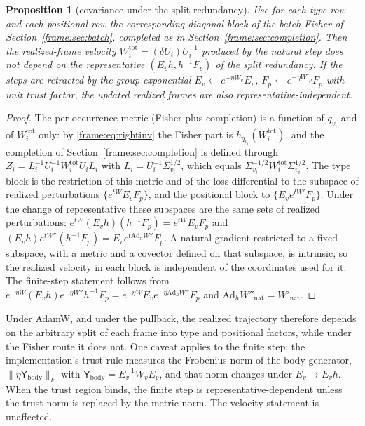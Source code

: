 \documentclass[11pt]{article}
\newtheorem{proposition}[theorem]{Proposition}
\theoremstyle{definition}
\theoremstyle{remark}
\providecommand{\Ad}{\mathrm{Ad}}
\begin{document}
\begin{proposition}[covariance under the split redundancy]\label{frame:prop:split}
Use for each type row and each positional row the corresponding diagonal block of the batch Fisher of Section~\ref{frame:sec:batch}, completed as in Section~\ref{frame:sec:completion}. Then the realized-frame velocity $W_i^{\mathrm{tot}}=(\delta U_i)U_i^{-1}$ produced by the natural step does not depend on the representative $(E_vh,h^{-1}F_p)$ of the split redundancy. If the steps are retracted by the group exponential $E_v\leftarrow e^{-\eta W_v}E_v$, $F_p\leftarrow e^{-\eta W'_p}F_p$ with unit trust factor, the updated realized frames are also representative-independent.
\end{proposition}
\begin{proof}
The per-occurrence metric (Fisher plus completion) is a function of $q_{v_i}$ and of $W_i^{\mathrm{tot}}$ only: by \eqref{frame:eq:rightinv} the Fisher part is $h_{q_{v_i}}(W_i^{\mathrm{tot}})$, and the completion of Section~\ref{frame:sec:completion} is defined through $Z_i=L_i^{-1}U_i^{-1}W_i^{\mathrm{tot}}U_iL_i$ with $L_i=U_i^{-1}\Sigma_{v_i}^{1/2}$, which equals $\Sigma_{v_i}^{-1/2}W_i^{\mathrm{tot}}\Sigma_{v_i}^{1/2}$. The type block is the restriction of this metric and of the loss differential to the subspace of realized perturbations $\{e^{tW}E_vF_p\}$, and the positional block to $\{E_ve^{tW'}F_p\}$. Under the change of representative these subspaces are the same sets of realized perturbations: $e^{tW}(E_vh)(h^{-1}F_p)=e^{tW}E_vF_p$ and $(E_vh)e^{tW''}(h^{-1}F_p)=E_ve^{t\Ad_hW''}F_p$. A natural gradient restricted to a fixed subspace, with a metric and a covector defined on that subspace, is intrinsic, so the realized velocity in each block is independent of the coordinates used for it. The finite-step statement follows from $e^{-\eta W}(E_vh)e^{-\eta W''}h^{-1}F_p=e^{-\eta W}E_ve^{-\eta\Ad_hW''}F_p$ and $\Ad_hW''_{\mathrm{nat}}=W'_{\mathrm{nat}}$.
\end{proof}

Under AdamW, and under the pullback, the realized trajectory therefore depends on the arbitrary split of each frame into type and positional factors, while under the Fisher route it does not. One caveat applies to the finite step: the implementation's trust rule measures the Frobenius norm of the body generator, $\|\eta\mathsf{Y}_{\mathrm{body}}\|_F$ with $\mathsf{Y}_{\mathrm{body}}=E_v^{-1}W_vE_v$, and that norm changes under $E_v\mapsto E_vh$. When the trust region binds, the finite step is representative-dependent unless the trust norm is replaced by the metric norm. The velocity statement is unaffected.
\end{document}

